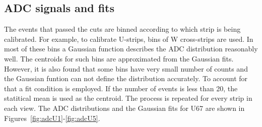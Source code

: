 \FloatBarrier
\subsection{ADC signals and fits}
The events that passed the cuts are binned according to which strip is being calibrated. For example, to calibrate U-strips, bins of W
cross-strips are used. In most of these bins a Gaussian function describes the ADC distribution reasonably well. The centroids for such bins
are approximated from the Gaussian fits. However, it is also found that some bins have very small number of counts and the Gaussian
funtion can not define the distribution accurately. To account for that a fit condition is employed. If the number of events is less 
than 20, the statitical mean is used as the centroid. The process is repeated for every strip in each view. The ADC distributions and the Gaussian
fits for U67 are shown in Figures~\ref{fig:adcU1}-\ref{fig:adcU5}.
